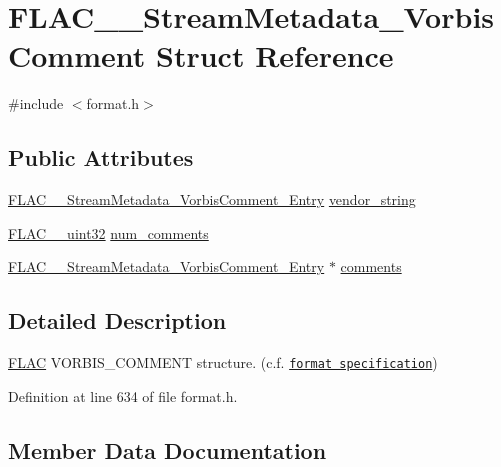 \hypertarget{struct_f_l_a_c_____stream_metadata___vorbis_comment}{}\section{F\+L\+A\+C\+\_\+\+\_\+\+Stream\+Metadata\+\_\+\+Vorbis\+Comment Struct Reference}
\label{struct_f_l_a_c_____stream_metadata___vorbis_comment}


{\ttfamily \#include $<$format.\+h$>$}

\subsection*{Public Attributes}
\begin{DoxyCompactItemize}
\item 
\hyperlink{struct_f_l_a_c_____stream_metadata___vorbis_comment___entry}{F\+L\+A\+C\+\_\+\+\_\+\+Stream\+Metadata\+\_\+\+Vorbis\+Comment\+\_\+\+Entry} \hyperlink{struct_f_l_a_c_____stream_metadata___vorbis_comment_a7a6dd7bacee57f0a59ac2d843cb79f98}{vendor\+\_\+string}
\item 
\hyperlink{ordinals_8h_a9c4005ea7ef8d564b0cc993cdd0e4e5e}{F\+L\+A\+C\+\_\+\+\_\+uint32} \hyperlink{struct_f_l_a_c_____stream_metadata___vorbis_comment_a6b5a521443691bc3f195c97b60203a3e}{num\+\_\+comments}
\item 
\hyperlink{struct_f_l_a_c_____stream_metadata___vorbis_comment___entry}{F\+L\+A\+C\+\_\+\+\_\+\+Stream\+Metadata\+\_\+\+Vorbis\+Comment\+\_\+\+Entry} $\ast$ \hyperlink{struct_f_l_a_c_____stream_metadata___vorbis_comment_ab4065e0e2fcaac759616e9e339acfa19}{comments}
\end{DoxyCompactItemize}


\subsection{Detailed Description}
\hyperlink{namespace_f_l_a_c}{F\+L\+AC} V\+O\+R\+B\+I\+S\+\_\+\+C\+O\+M\+M\+E\+NT structure. (c.\+f. \href{../format.html#metadata_block_vorbis_comment}{\tt format specification}) 

Definition at line 634 of file format.\+h.



\subsection{Member Data Documentation}
